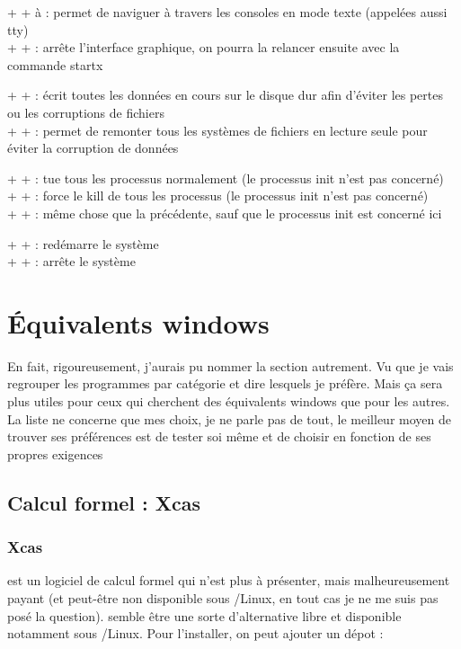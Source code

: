 \documentclass[a4paper,twoside]{article}
\begin{document}
 +  +  à  : permet de naviguer à travers les consoles en mode texte (appelées aussi tty)\\
 +  +  : arrête l'interface graphique, on pourra la relancer ensuite avec la commande startx

 +  +  : écrit toutes les données en cours sur le disque dur afin d'éviter les pertes ou les corruptions de fichiers\\
 +  +  : permet de remonter tous les systèmes de fichiers en lecture seule pour éviter la corruption de données

 +  +  : tue tous les processus normalement (le processus init n'est pas concerné)\\
 +  +  : force le kill de tous les processus (le processus init n'est pas concerné)\\
 +  +  : même chose que la précédente, sauf que le processus init est concerné ici

 +  +  : redémarre le système\\
 +  +  : arrête le système

\section{Équivalents windows}
En fait, rigoureusement, j'aurais pu nommer la section autrement. Vu que je vais regrouper les programmes par catégorie et dire lesquels je préfère. Mais ça sera plus utiles pour ceux qui cherchent des équivalents windows que pour les autres.
{\red La liste ne concerne que mes choix, je ne parle pas de tout, le meilleur moyen de trouver ses préférences est de tester soi même et de choisir en fonction de ses propres exigences}

\subsection{Calcul formel : Xcas}
\subsubsection{Xcas}
 est un logiciel de calcul formel qui n'est plus à présenter, mais malheureusement payant (et peut-être non disponible sous /Linux, en tout cas je ne me suis pas posé la question).  semble être une sorte d'alternative libre  et disponible notamment sous /Linux. Pour l'installer, on peut ajouter un dépot :
\end{document}
